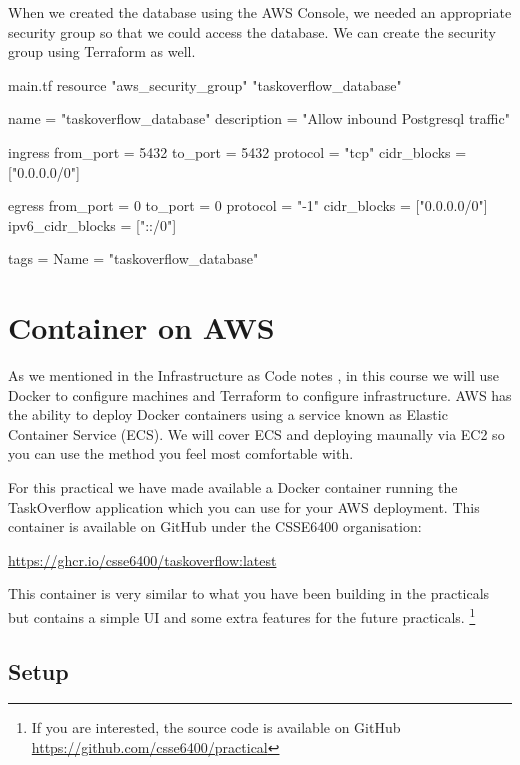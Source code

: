 \documentclass{csse4400}
\begin{document}
When we created the database using the AWS Console,
we needed an appropriate security group so that we could access the database.
We can create the security group using Terraform as well.

\begin{code}[language=terraform,numbers=none]{main.tf}
resource "aws_security_group" "taskoverflow_database" {
  name        = "taskoverflow_database"
  description = "Allow inbound Postgresql traffic"

  ingress {
    from_port        = 5432
    to_port          = 5432
    protocol         = "tcp"
    cidr_blocks      = ["0.0.0.0/0"]
  }

  egress {
    from_port        = 0
    to_port          = 0
    protocol         = "-1"
    cidr_blocks      = ["0.0.0.0/0"]
    ipv6_cidr_blocks = ["::/0"]
  }

  tags = {
    Name = "taskoverflow_database"
  }
}
\end{code}


\section{Container on AWS}

As we mentioned in the Infrastructure as Code notes \cite{iac-notes},
in this course we will use Docker to configure machines and Terraform to configure infrastructure.
AWS has the ability to deploy Docker containers using a service known as Elastic Container Service (ECS).
We will cover ECS and deploying maunally via EC2 so you can use the method you feel most comfortable with.

For this practical we have made available a Docker container running the TaskOverflow application which you can use for your AWS deployment.
This container is available on GitHub under the CSSE6400 organisation:

\url{https://ghcr.io/csse6400/taskoverflow:latest}

This container is very similar to what you have been building in the practicals but contains a simple UI and some extra features for the future practicals.%
\footnote{If you are interested, the source code is available on GitHub \url{https://github.com/csse6400/practical}}

\subsection{Setup}
\end{document}
